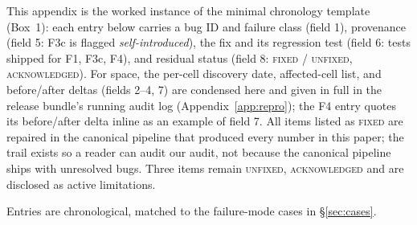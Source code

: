 This appendix is the worked instance of the minimal chronology
template (Box~1): each entry below carries a
bug ID and failure class (field 1), provenance (field 5: F3c is
flagged \emph{self-introduced}), the fix and its regression test
(field 6: tests shipped for F1, F3c, F4), and residual status
(field 8: \textsc{fixed} / \textsc{unfixed, acknowledged}). For
space, the per-cell discovery date, affected-cell list, and
before/after deltas (fields 2--4, 7) are condensed here and given
in full in the release bundle's running audit log
(Appendix~\ref{app:repro}); the F4 entry quotes its before/after
delta inline as an example of field 7. All items listed as
\textsc{fixed} are repaired in the canonical pipeline that
produced every number in this paper; the trail exists so a reader
can audit our audit, not because the canonical pipeline ships with
unresolved bugs. Three items remain \textsc{unfixed, acknowledged}
and are disclosed as active limitations.

Entries are chronological, matched to the failure-mode cases in
\S\ref{sec:cases}.

